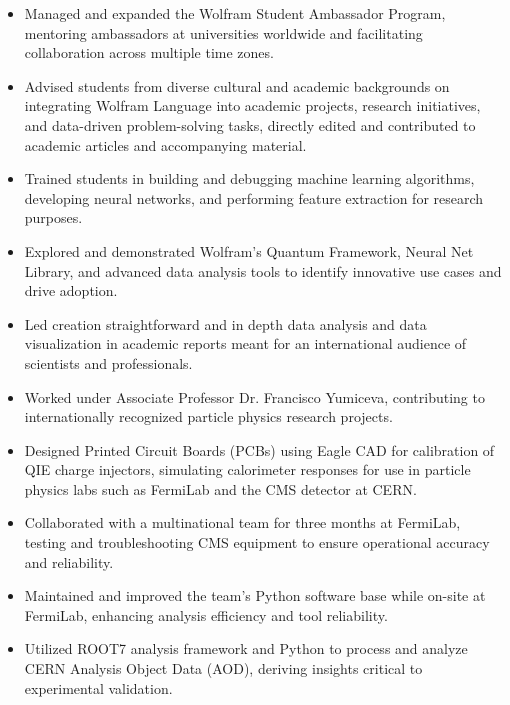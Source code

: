\documentclass[10pt,a4paper,ragged2e,withhyper]{altacv}
\begin{document}
\begin{paracol}{2}
\begin{itemize}
    \item Managed and expanded the Wolfram Student Ambassador Program, mentoring ambassadors at universities worldwide and facilitating collaboration across multiple time zones.
    \item Advised students from diverse cultural and academic backgrounds on integrating Wolfram Language into academic projects, research initiatives, and data-driven problem-solving tasks, directly edited and contributed to academic articles and accompanying material.
    \item Trained students in building and debugging machine learning algorithms, developing neural networks, and performing feature extraction for research purposes.
    \item Explored and demonstrated Wolfram’s Quantum Framework, Neural Net Library, and advanced data analysis tools to identify innovative use cases and drive adoption.
    \item Led creation straightforward and in depth data analysis and data visualization in academic reports meant for an international audience of scientists and professionals.
\end{itemize}
\begin{itemize}
    \item Worked under Associate Professor Dr. Francisco Yumiceva, contributing to internationally recognized particle physics research projects.
    \item Designed Printed Circuit Boards (PCBs) using Eagle CAD for calibration of QIE charge injectors, simulating calorimeter responses for use in particle physics labs such as FermiLab and the CMS detector at CERN.
    \item Collaborated with a multinational team for three months at FermiLab, testing and troubleshooting CMS equipment to ensure operational accuracy and reliability.
    \item Maintained and improved the team’s Python software base while on-site at FermiLab, enhancing analysis efficiency and tool reliability.
    \item Utilized ROOT7 analysis framework and Python to process and analyze CERN Analysis Object Data (AOD), deriving insights critical to experimental validation.



\end{itemize}
\end{paracol}
\end{document}
